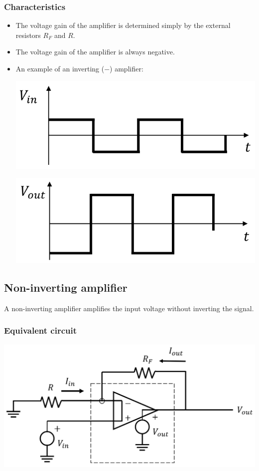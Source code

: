 \documentclass[11pt]{article}
\begin{document}
\subsubsection{Characteristics}
\label{sec:org2894e51}
\begin{itemize}
\item The voltage gain of the amplifier is determined simply by the external resistors \(R_F\) and \(R\).
\item The voltage gain of the amplifier is always negative.
\item An example of an inverting (\(-\)) amplifier:
\begin{center}
\includegraphics[width=.9\linewidth]{./images/inverting-amplifier-input-voltage.png}
\end{center}
\begin{center}
\includegraphics[width=.9\linewidth]{./images/inverting-amplifier-output-voltage.png}
\end{center}
\end{itemize}
\subsection{Non-inverting amplifier}
\label{sec:org790eae5}
A non-inverting amplifier amplifies the input voltage without inverting the signal.
\subsubsection{Equivalent circuit}
\label{sec:org256a106}
\begin{center}
\includegraphics[width=.9\linewidth]{./images/non-inverting-amplifier-circuit.png}
\end{center}
\end{document}
